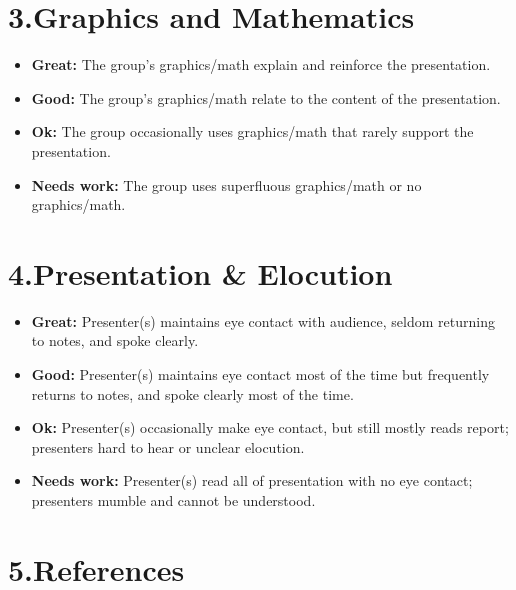 \documentclass[12pt]{article}
\newcommand{\rubricitem}[2]{\textbf{#1:} #2}
\begin{document}
\section*{3.\quad Graphics and Mathematics}

\begin{itemize}[leftmargin=1.5em, itemsep=0.4em]
    \item[$\square$] \rubricitem{Great}{The group's graphics/math explain and reinforce the presentation.}
    \item[$\square$] \rubricitem{Good}{The group's graphics/math relate to the content of the presentation.}
    \item[$\square$] \rubricitem{Ok}{The group occasionally uses graphics/math that rarely support the presentation.}
    \item[$\square$] \rubricitem{Needs work}{The group uses superfluous graphics/math or no graphics/math.}
\end{itemize}


\section*{4.\quad Presentation \& Elocution}

\begin{itemize}[leftmargin=1.5em, itemsep=0.4em]
    \item[$\square$] \rubricitem{Great}{Presenter(s) maintains eye contact with audience, seldom returning to notes, and spoke clearly.}
    \item[$\square$] \rubricitem{Good}{Presenter(s) maintains eye contact most of the time but frequently returns to notes, and spoke clearly most of the time.}
    \item[$\square$] \rubricitem{Ok}{Presenter(s) occasionally make eye contact, but still mostly reads report; presenters hard to hear or unclear elocution.}
    \item[$\square$] \rubricitem{Needs work}{Presenter(s) read all of presentation with no eye contact; presenters mumble and cannot be understood.}
\end{itemize}


\section*{5.\quad References}
\end{document}
